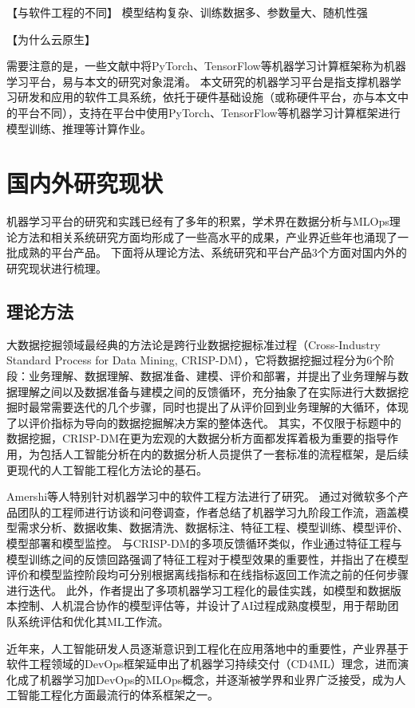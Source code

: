 【与软件工程的不同】
模型结构复杂、训练数据多、参数量大、随机性强

【为什么云原生】

需要注意的是，一些文献中将PyTorch、TensorFlow等机器学习计算框架称为机器学习平台，易与本文的研究对象混淆。
本文研究的机器学习平台是指支撑机器学习研发和应用的软件工具系统，依托于硬件基础设施（或称硬件平台，亦与本文中的平台不同），支持在平台中使用PyTorch、TensorFlow等机器学习计算框架进行模型训练、推理等计算作业。


%
\section{国内外研究现状}

机器学习平台的研究和实践已经有了多年的积累，学术界在数据分析与MLOps理论方法和相关系统研究方面均形成了一些高水平的成果，产业界近些年也涌现了一批成熟的平台产品。
下面将从理论方法、系统研究和平台产品3个方面对国内外的研究现状进行梳理。

\subsection{理论方法}

大数据挖掘领域最经典的方法论是跨行业数据挖掘标准过程（Cross-Industry Standard Process for Data Mining, CRISP-DM）\cite{Wir00}，它将数据挖掘过程分为6个阶段：业务理解、数据理解、数据准备、建模、评价和部署，并提出了业务理解与数据理解之间以及数据准备与建模之间的反馈循环，充分抽象了在实际进行大数据挖掘时最常需要迭代的几个步骤，同时也提出了从评价回到业务理解的大循环，体现了以评价指标为导向的数据挖掘解决方案的整体迭代。
其实，不仅限于标题中的数据挖掘，CRISP-DM在更为宏观的大数据分析方面都发挥着极为重要的指导作用，为包括人工智能分析在内的数据分析人员提供了一套标准的流程框架，是后续更现代的人工智能工程化方法论的基石。

Amershi等人\cite{Ame19}特别针对机器学习中的软件工程方法进行了研究。
通过对微软多个产品团队的工程师进行访谈和问卷调查，作者总结了机器学习九阶段工作流，涵盖模型需求分析、数据收集、数据清洗、数据标注、特征工程、模型训练、模型评价、模型部署和模型监控。
与CRISP-DM的多项反馈循环类似，作业通过特征工程与模型训练之间的反馈回路强调了特征工程对于模型效果的重要性，并指出了在模型评价和模型监控阶段均可分别根据离线指标和在线指标返回工作流之前的任何步骤进行迭代。
此外，作者提出了多项机器学习工程化的最佳实践，如模型和数据版本控制、人机混合协作的模型评估等，并设计了AI过程成熟度模型，用于帮助团队系统评估和优化其ML工作流。

近年来，人工智能研发人员逐渐意识到工程化在应用落地中的重要性，产业界基于软件工程领域的DevOps框架延申出了机器学习持续交付（CD4ML）理念，进而演化成了机器学习加DevOps的MLOps概念，并逐渐被学界和业界广泛接受，成为人工智能工程化方面最流行的体系框架之一。

